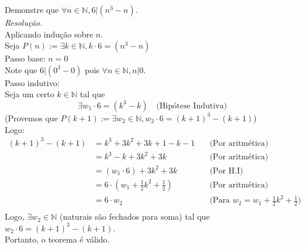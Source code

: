 Demonstre que $\forall n \in \mathbb{N}, 6 | (n^3 - n)$.\\
\emph{Resolução.}\\
Aplicando indução sobre $n$. \\
Seja $P(n) := \exists k \in \mathbb{N}, k \cdot 6 = (n^3 - n)$ \\
Passo base: $n = 0$ \\
Note que $6 | (0^3 - 0)$ pois $\forall n \in \mathbb{N}, n | 0$. \\
Passo indutivo: \\
Seja um certo $k \in \mathbb{N}$ tal que
\begin{displaymath}
    \exists w_1 \cdot 6 = (k^3 - k) \quad \text{(Hipótese Indutiva)}
\end{displaymath}
(Provemos que $P(k + 1) := \exists w_2 \in \mathbb{N}, w_2 \cdot 6 = (k + 1)^3 - (k + 1)$) \\
Logo:
\begin{align*}
    (k + 1)^3 - (k + 1) & = k^3 + 3k^2 + 3k + 1 - k - 1                  & \quad \text{(Por aritmética)}                                  \\
                        & = k^3 - k + 3k^2 + 3k                          & \quad \text{(Por aritmética)}                                  \\
                        & = (w_1 \cdot 6) + 3k^2 + 3k                    & \quad \text{(Por H.I)}                                         \\
                        & = 6 \cdot (w_1 + \frac{1}{2}k^2 + \frac{1}{2}) & \quad \text{(Por aritmética)}                                  \\
                        & = 6 \cdot w_2                                  & \quad \text{(Para $w_2 = w_1 + \frac{1}{2}k^2 + \frac{1}{2}$)} \\
\end{align*}
Logo, $\exists w_2 \in \mathbb{N}$ (naturais são fechados para soma) tal que $w_2 \cdot 6 = (k + 1)^3 - (k + 1)$. \\
Portanto, o teorema é válido.